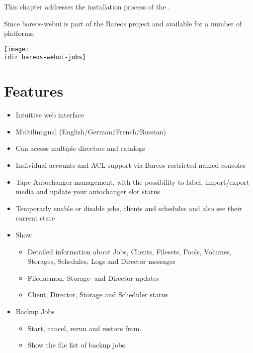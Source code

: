 
This chapter addresses the installation process of the \bareosWebui.

Since  bareos-webui is part of the Bareos project and available for a number of platforms.

\begin{center}
  \texttt{[image: \\idir bareos-webui-jobs]}
\end{center}

\section{Features}

\begin{itemize}
\item Intuitive web interface
\item Multilinugual (English/German/French/Russian)
\item Can access multiple directors and catalogs
\item Individual accounts and ACL support via Bareos restricted named consoles
\item Tape Autochanger management, with the possibility to label, import/export media and update your autochanger slot status
\item Temporarly enable or disable jobs, clients and schedules and also see their current state
\item Show
    \begin{itemize}
    \item Detailed information about Jobs, Clients, Filesets, Pools, Volumes, Storages, Schedules, Logs and Director messages
    \item Filedaemon, Storage- and Director updates
    \item Client, Director, Storage and Scheduler status
    \end{itemize}
\item Backup Jobs
    \begin{itemize}
    \item Start, cancel, rerun and restore from.
    \item Show the file list of backup jobs

\end{itemize}
\end{itemize}
